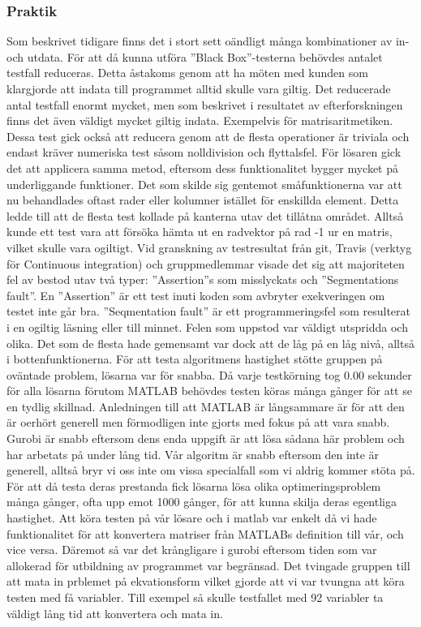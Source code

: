 	\subsubsection{Praktik}
	Som beskrivet tidigare finns det i stort sett oändligt många kombinationer av in- och utdata.	För att då kunna utföra ''Black Box''-testerna behövdes antalet testfall reduceras. Detta åstakoms genom att ha möten med kunden som klargjorde att indata till programmet alltid skulle vara giltig. Det reducerade antal testfall enormt mycket, men som beskrivet i resultatet av efterforskningen finns det även väldigt mycket giltig indata. Exempelvis för matrisaritmetiken. Dessa test gick också att reducera genom att de flesta operationer är triviala och endast kräver numeriska test såsom nolldivision och flyttalsfel. \newline
	För lösaren gick det att applicera samma metod, eftersom dess funktionalitet bygger mycket på underliggande funktioner. Det som skilde sig gentemot småfunktionerna var att nu behandlades oftast rader eller kolumner istället för enskillda element. Detta ledde till att de flesta test kollade på kanterna utav det tillåtna området. Alltså kunde ett test vara att försöka hämta ut en radvektor på rad -1 ur en matris, vilket skulle vara ogiltigt.\newline
Vid granskning av testresultat från git, Travis (verktyg för Continuous integration) och gruppmedlemmar visade det sig att majoriteten fel av bestod utav två typer: ''Assertion''s som misslyckats och ''Segmentations fault''. En ''Assertion'' är ett test inuti koden som avbryter exekveringen om testet inte går bra. ''Seqmentation fault'' är ett programmeringsfel som resulterat i en ogiltig läsning eller till minnet. Felen som uppstod var väldigt utspridda och olika. Det som de flesta hade gemensamt var dock att de låg på en låg nivå, alltså i bottenfunktionerna. \newline	
	För att testa algoritmens hastighet stötte gruppen på oväntade problem, lösarna var för snabba.	Då varje testkörning tog 0.00 sekunder för alla lösarna förutom MATLAB behövdes testen köras många gånger för att se en tydlig skillnad. Anledningen till att MATLAB är långsammare är för att den är oerhört generell men förmodligen inte gjorts med fokus på att vara snabb. Gurobi är snabb eftersom dens enda uppgift är att lösa sådana här problem och har arbetats på under lång tid. Vår algoritm är snabb eftersom den inte är generell, alltså bryr vi oss inte om vissa specialfall som vi aldrig kommer stöta på. \newline
	För att då testa deras prestanda fick lösarna lösa olika optimeringsproblem många gånger, ofta upp emot 1000 gånger, för att kunna skilja deras egentliga hastighet. Att köra testen på vår lösare och i matlab var enkelt då vi hade funktionalitet för att konvertera matriser från MATLABs definition till vår, och vice versa. Däremot så var det krångligare i gurobi eftersom tiden som var allokerad för utbildning av programmet var begränsad. Det tvingade gruppen till att mata in prblemet på ekvationsform vilket gjorde att vi var tvungna att köra testen med få variabler. Till exempel så skulle testfallet med 92 variabler ta väldigt lång tid att konvertera och mata in. \newline

